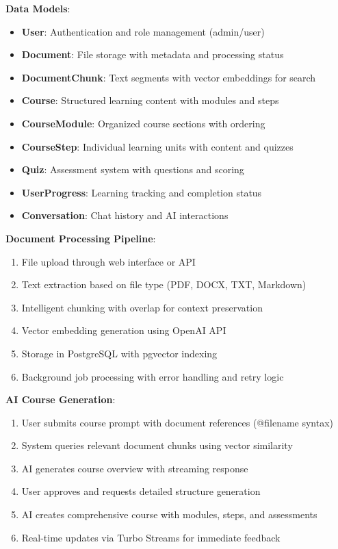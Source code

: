 \documentclass[a4paper,11pt]{article}
\begin{document}
\textbf{Data Models}:
\begin{itemize}
    \item \textbf{User}: Authentication and role management (admin/user)
    \item \textbf{Document}: File storage with metadata and processing status
    \item \textbf{DocumentChunk}: Text segments with vector embeddings for search
    \item \textbf{Course}: Structured learning content with modules and steps
    \item \textbf{CourseModule}: Organized course sections with ordering
    \item \textbf{CourseStep}: Individual learning units with content and quizzes
    \item \textbf{Quiz}: Assessment system with questions and scoring
    \item \textbf{UserProgress}: Learning tracking and completion status
    \item \textbf{Conversation}: Chat history and AI interactions
\end{itemize}

\textbf{Document Processing Pipeline}:
\begin{enumerate}
    \item File upload through web interface or API
    \item Text extraction based on file type (PDF, DOCX, TXT, Markdown)
    \item Intelligent chunking with overlap for context preservation
    \item Vector embedding generation using OpenAI API
    \item Storage in PostgreSQL with pgvector indexing
    \item Background job processing with error handling and retry logic
\end{enumerate}

\textbf{AI Course Generation}:
\begin{enumerate}
    \item User submits course prompt with document references (@filename syntax)
    \item System queries relevant document chunks using vector similarity
    \item AI generates course overview with streaming response
    \item User approves and requests detailed structure generation
    \item AI creates comprehensive course with modules, steps, and assessments
    \item Real-time updates via Turbo Streams for immediate feedback
\end{enumerate}
\end{document}
